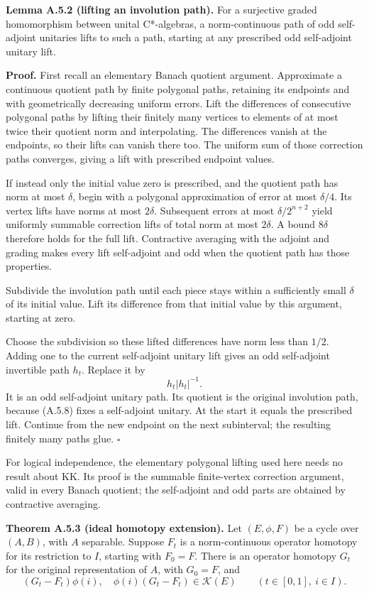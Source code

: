 \documentclass[
  11pt,
]{article}
\begin{document}
\textbf{Lemma A.5.2 (lifting an involution path).} For a surjective
graded homomorphism between unital C*-algebras, a norm-continuous path
of odd self-adjoint unitaries lifts to such a path, starting at any
prescribed odd self-adjoint unitary lift.

\textbf{Proof.} First recall an elementary Banach quotient argument.
Approximate a continuous quotient path by finite polygonal paths,
retaining its endpoints and with geometrically decreasing uniform
errors. Lift the differences of consecutive polygonal paths by lifting
their finitely many vertices to elements of at most twice their quotient
norm and interpolating. The differences vanish at the endpoints, so
their lifts can vanish there too. The uniform sum of those correction
paths converges, giving a lift with prescribed endpoint values.

If instead only the initial value zero is prescribed, and the quotient
path has norm at most \(\delta\), begin with a polygonal approximation
of error at most \(\delta/4\). Its vertex lifts have norms at most
\(2\delta\). Subsequent errors at most \(\delta/2^{n+2}\) yield
uniformly summable correction lifts of total norm at most \(2\delta\). A
bound \(8\delta\) therefore holds for the full lift. Contractive
averaging with the adjoint and grading makes every lift self-adjoint and
odd when the quotient path has those properties.

Subdivide the involution path until each piece stays within a
sufficiently small \(\delta\) of its initial value. Lift its difference
from that initial value by this argument, starting at zero.

Choose the subdivision so these lifted differences have norm less than
\(1/2\). Adding one to the current self-adjoint unitary lift gives an
odd self-adjoint invertible path \(h_t\). Replace it by \[
h_t|h_t|^{-1}.
\tag{A.5.8}
\] It is an odd self-adjoint unitary path. Its quotient is the original
involution path, because (A.5.8) fixes a self-adjoint unitary. At the
start it equals the prescribed lift. Continue from the new endpoint on
the next subinterval; the resulting finitely many paths glue.
\(\square\)

For logical independence, the elementary polygonal lifting used here
needs no result about KK. Its proof is the summable finite-vertex
correction argument, valid in every Banach quotient; the self-adjoint
and odd parts are obtained by contractive averaging.

\textbf{Theorem A.5.3 (ideal homotopy extension).} Let \((E,\phi,F)\) be
a cycle over \((A,B)\), with \(A\) separable. Suppose \(F_t\) is a
norm-continuous operator homotopy for its restriction to \(I\), starting
with \(F_0=F\). There is an operator homotopy \(G_t\) for the original
representation of \(A\), with \(G_0=F\), and \[
(G_t-F_t)\phi(i),\quad\phi(i)(G_t-F_t)\in\mathcal K(E)
\qquad(t\in[0,1],\ i\in I).
\tag{A.5.9}
\]
\end{document}
